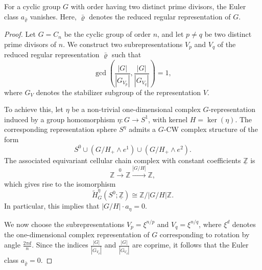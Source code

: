 \documentclass[10pt,a4paper]{amsart}
\renewcommand{\rho}{\varrho}
\newcommand{\uZ}{\underline{\mathbb{Z}}}
\begin{document}
\begin{prop}
    For a cyclic group $G$ with order having two distinct prime divisors, the Euler class $a_{\bar{\rho}}$ vanishes. Here, $\bar{\rho}$ denotes the reduced regular representation of $G.$
\end{prop}

\begin{proof}
Let \( G = C_n \) be the cyclic group of order \( n \), and let \( p \neq q \) be two distinct prime divisors of \( n \). We construct two subrepresentations \( V_p \) and \( V_q \) of the reduced regular representation \( \bar{\rho} \) such that
\[
\gcd\left( \frac{|G|}{|G_{V_p}|}, \frac{|G|}{|G_{V_q}|} \right) = 1,
\]
where \( G_V \) denotes the stabilizer subgroup of the representation \( V \).

To achieve this, let \( \eta \) be a non-trivial one-dimensional complex \( G \)-representation induced by a group homomorphism \( \eta \colon G \to S^1 \), with kernel \( H = \ker(\eta) \). The corresponding representation sphere \( S^\eta \) admits a \( G \)-CW complex structure of the form
\[
S^0 \cup (G/H_+ \wedge e^1) \cup (G/H_+ \wedge e^2).
\]
The associated equivariant cellular chain complex with constant coefficients \( \uZ \) is
\[
\mathbb{Z} \xrightarrow{0} \mathbb{Z} \xrightarrow{|G/H|} \mathbb{Z},
\]
which gives rise to the isomorphism
\[
\tilde{H}^\eta_G(S^0; \uZ) \cong \mathbb{Z}/|G/H|\mathbb{Z}.
\]
In particular, this implies that \( |G/H| \cdot a_\eta = 0 \).

We now choose the subrepresentations \( V_p = \xi^{n/p} \) and \( V_q = \xi^{n/q} \), where \( \xi^d \) denotes the one-dimensional complex representation of \( G \) corresponding to rotation by angle \( \frac{2\pi d}{n} \). Since the indices \( \frac{|G|}{|G_{V_p}|} \) and \( \frac{|G|}{|G_{V_q}|} \) are coprime, it follows that the Euler class \( a_{\bar{\rho}} = 0 \).
\end{proof}
\end{document}
